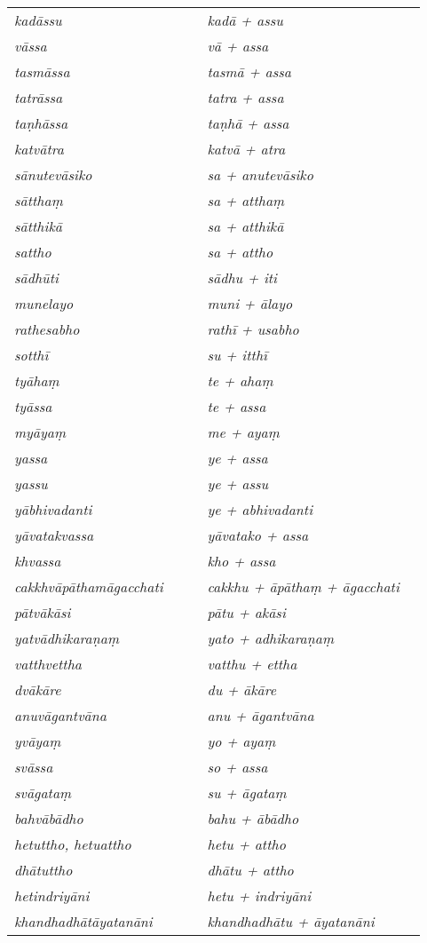 \begin{longtable}[c]{@{}>{\itshape}p{0.44\linewidth}%
	>{\itshape}p{0.5\linewidth}@{}}
kad\=assu & kad\=a + assu \\
v\=assa & v\=a + assa \\
tasm\=assa & tasm\=a + assa \\
tatr\=assa & tatra + assa \\
ta\d nh\=assa & ta\d nh\=a + assa \\
katv\=atra & katv\=a + atra \\
s\=anutev\=asiko & sa + anutev\=asiko \\
s\=attha\d m & sa + attha\d m \\
s\=atthik\=a & sa + atthik\=a \\
sattho & sa + attho \\
s\=adh\=uti & s\=adhu + iti \\
munelayo & muni + \=alayo \\
rathesabho & rath\=i + usabho \\
sotth\=i & su + itth\=i \\
ty\=aha\d m & te + aha\d m \\
ty\=assa & te + assa \\
my\=aya\d m & me + aya\d m \\
yassa & ye + assa \\
yassu & ye + assu \\
y\=abhivadanti & ye + abhivadanti \\
y\=avatakvassa & y\=avatako + assa \\
khvassa & kho + assa \\
cakkhv\=ap\=atham\=agacchati & cakkhu + \=ap\=atha\d m + \=agacchati \\
p\=atv\=ak\=asi & p\=atu + ak\=asi \\
yatv\=adhikara\d na\d m & yato + adhikara\d na\d m \\
vatthvettha & vatthu + ettha \\
dv\=ak\=are & du + \=ak\=are \\
anuv\=agantv\=ana & anu + \=agantv\=ana \\
yv\=aya\d m & yo + aya\d m \\
sv\=assa & so + assa \\
sv\=agata\d m & su + \=agata\d m \\
bahv\=ab\=adho & bahu + \=ab\=adho \\
hetuttho, hetuattho & hetu + attho \\
dh\=atuttho & dh\=atu + attho \\
hetindriy\=ani & hetu + indriy\=ani \\
khandhadh\=at\=ayatan\=ani & khandhadh\=atu + \=ayatan\=ani \\

\end{longtable}
